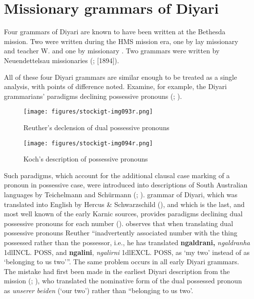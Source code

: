 \section{{Missionary grammars of Diyari}}
\label{sec:key:8.2}\label{bkm:Ref333934780}\label{bkm:Ref456095221}

Four grammars of Diyari are known to have been written at the Bethesda mission. Two were written during the HMS mission era, one by lay missionary and teacher W. \citet{koch_untitled_1868} and one by missionary \citet{schoknecht_grammar_1947}. Two grammars were written by Neuendettelsau missionaries (\citealt{flierl_christianieli_1880}; \citealt{reuther_ms_1899}[1894]).

All of these four Diyari grammars are similar enough to be treated as a single analysis, with points of difference noted. Examine, for example, the Diyari grammarians' paradigms declining possessive pronouns (; ).


\begin{figure}[p]
\texttt{[image: figures/stockigt-img093r.png]}
\caption{Reuther’s declension of dual possessive pronouns \citeyearpar[21]{reuther_dieri_1894}}
\label{fig:key:146}
\end{figure}

\begin{figure}[p]
\texttt{[image: figures/stockigt-img094r.png]}
\caption{Koch’s description of possessive pronouns \citeyearpar{koch_untitled_1868}}
\label{fig:key:147}
\end{figure}

Such paradigms, which account for the additional clausal case marking of a pronoun in possessive case, were introduced into descriptions of South Australian languages by Teichelmann and Schürmann (\citeyear{teichelmann_outlines_1840}; ).  grammar of Diyari, which was translated into English by Hercus \& Schwarzschild (\citeyear{Hercus_Schwarzschild1981}), and which is the last, and most well known of the early Karnic sources, provides paradigms declining dual possessive pronouns for each number (). \citet[27]{austin_notitle_1981} observes that when translating dual possessive pronouns Reuther “inadvertently associated number with the thing possessed rather than the possessor, i.e., he has translated \textbf{ngaldrani,} \textit{ngaldranha} 1dlINCL. POSS, and \textbf{ngalini}, \textit{ngalirni} 1dlEXCL. POSS, as `my two' instead of as `belonging to us two’\thinspace”. The same problem occurs in all early Diyari grammars. The mistake had first been made in the earliest Diyari description from the mission (\citealt{koch_untitled_1868}; ), who translated the nominative form of the dual possessed pronoun as \textit{unserer beiden} (`our two’) rather than “belonging to us two’.

